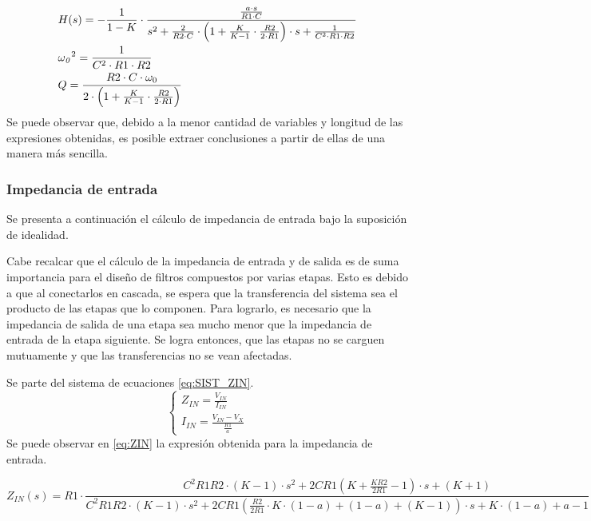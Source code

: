 \begin{equation}    
        \begin{split}    
            &H(s) = -\frac{1}{1-K}\cdot \frac{\frac{a\cdot s}{R1\cdot C}}{s^2+\frac{2}{R2\cdot C}\cdot \left(1+\frac{K}{K-1}\cdot \frac{R2}{2\cdot R1}\right)\cdot s+\frac{1}{C^2\cdot R1 \cdot R2}}\\
            &{{\it \omega_0}}^2=\frac{1}{C^2\cdot R1 \cdot R2}\\
            &Q=\frac{R2\cdot C\cdot \omega_0}{2\cdot\left(1+\frac{K}{K-1}\cdot \frac{R2}{2\cdot R1}\right)}\\
        \end{split}    
    \label{eq:SOLUC_NEW_DESIGN}
\end{equation}
Se puede observar que, debido a la menor cantidad de variables y longitud de las expresiones obtenidas, es posible extraer conclusiones a partir de ellas de una manera m\'as sencilla.

\subsubsection{Impedancia de entrada}
Se presenta a continuaci\'on el c\'alculo de impedancia de entrada bajo la suposici\'on de  idealidad.

Cabe recalcar que el c\'alculo de la impedancia de entrada y de salida es de suma importancia para el dise\~no de filtros compuestos por varias etapas. Esto es debido a que al conectarlos en cascada, se espera que la transferencia del sistema sea el producto de las etapas que lo componen. Para lograrlo, es necesario que la impedancia de salida de una etapa sea mucho menor que la impedancia de entrada de la etapa siguiente. Se logra entonces, que las etapas no se carguen mutuamente y que las transferencias no se vean afectadas.

Se parte del sistema de ecuaciones \ref{eq:SIST_ZIN}.
\begin{equation}    
    \left\{
        \begin{array}{ll}
            Z_{IN} = \frac{V_{IN}}{I_{IN}}\\
            I_{IN} = \frac{V_{IN}-V_X}{\frac{R1}{a}}
            
        \end{array}
    \right.
    \label{eq:SIST_ZIN}
\end{equation}
Se puede observar en \ref{eq:ZIN} la expresi\'on obtenida para la impedancia de entrada. 

\begin{equation}
    Z_{IN}(s) =R1\cdot \frac{ C^2 R1 R2\cdot (K-1) \cdot s^2 + 2 C R1\left( K+\frac{K R2}{2 R1} - 1\right) \cdot s + (K+1)  }{C^2 R1 R2\cdot (K-1) \cdot s^2+2 C R1\left( \frac{R2}{2 R1} \cdot K \cdot(1-a) +(1-a) + (K-1)\right) \cdot s + K\cdot (1-a)+ a -1}
    \label{eq:ZIN}
\end{equation}


